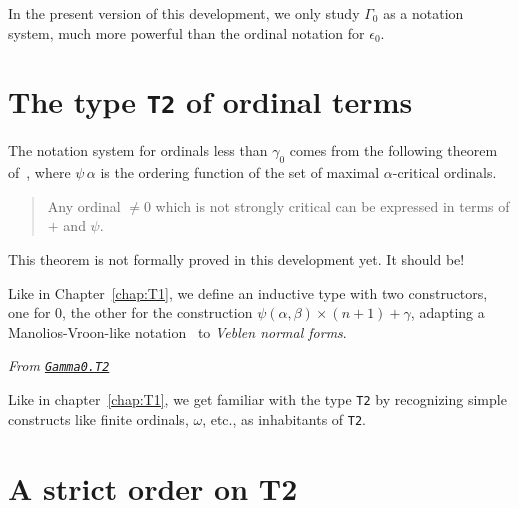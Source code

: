 In the present version of this development, we  only study $\Gamma_0$ as a notation system, much more powerful than the ordinal notation for $\epsilon_0$.

%




\section{The type \texttt{T2} of ordinal terms}

The notation system for ordinals less than $\gamma_0$ comes from the following theorem of~\cite{schutte}, where $\psi\,\alpha$ is the ordering function 
of the set of maximal $\alpha$-critical ordinals.


\begin{quote}
  Any ordinal $\not= 0$ which is not strongly critical can be expressed in terms of $+$ and $\psi$.
\end{quote}

\begin{project}
This theorem is not formally proved in this development yet. It should be!
\end{project}


Like in Chapter~\ref{chap:T1}, we define an inductive type with two constructors, one for $0$, the other for the construction $\psi(\alpha,\beta)\times(n+1)+\gamma$, adapting a Manolios-Vroon-like notation~\cite{Manolios2005} to
\emph{Veblen normal forms}.
\label{types:T2}

\noindent\emph{From \href{../theories/html/hydras.Gamma0.T2.html\#T2}%
{\texttt{Gamma0.T2}}}




Like in chapter~\ref{chap:T1}, we get familiar with the type \texttt{T2} by recognizing simple constructs like finite ordinals, $\omega$, etc., as inhabitants of \texttt{T2}.



\section{A strict order on T2}

